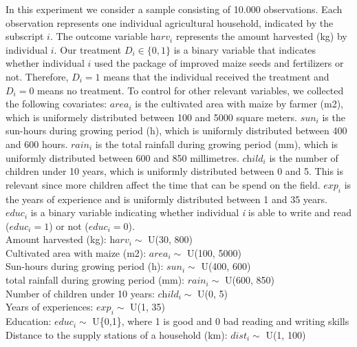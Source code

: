 In this experiment we consider a sample consisting of 10.000 observations. Each observation represents one individual agricultural household, indicated by the subscript $\textit{i}$. The outcome variable $\textit{harv}_i$ represents the amount harvested (kg) by individual $\textit{i}$. Our treatment $\textit{D}_i \in \{0,1\}$ is a binary variable that indicates whether individual $\textit{i}$ used the package of improved maize seeds and fertilizers or not. Therefore, $\textit{D}_i = 1$ means that the individual received the treatment and $\textit{D}_i = 0$ means no treatment. To control for other relevant variables, we collected the following covariates: $\textit{area}_i$ is the cultivated area with maize by farmer (m2), which is uniformely distributed between 100 and 5000 square meters. $\textit{sun}_i$ is the sun-hours during growing period (h), which is uniformly distributed between 400 and 600 hours. $\textit{rain}_i$ is the total rainfall during growing period (mm), which is uniformly distributed between 600 and 850 millimetres. $\textit{child}_i$ is the number of children under 10 years, which is uniformly distributed between 0 and 5. This is relevant since more children affect the time that can be spend on the field. $\textit{exp}_i$ is the years of experience and is uniformly distributed between 1 and 35 years. $\textit{educ}_i$ is a binary variable indicating whether individual \textit{i} is able to write and read ($\textit{educ}_i = 1$) or not ($\textit{educ}_i = 0$). \\


Amount harvested (kg):  $\textit{harv}_i \sim$ U(30, 800)  \\
Cultivated area with maize (m2): $\textit{area}_i \sim$ U(100, 5000) \\
Sun-hours during growing period (h): $\textit{sun}_i \sim$ U(400, 600) \\
total rainfall during growing period (mm): $\textit{rain}_i \sim$ U(600, 850) \\
Number of children under 10 years: $\textit{child}_i \sim$ U(0, 5)   \\
Years of experiences: $\textit{exp}_i \sim$ U(1, 35)  \\
Education: $\textit{educ}_i \sim$ U\{0,1\}, where 1 is good and 0 bad reading and writing skills \\
Distance to the supply stations of a household (km): $\textit{dist}_i \sim$ U(1, 100) \\

